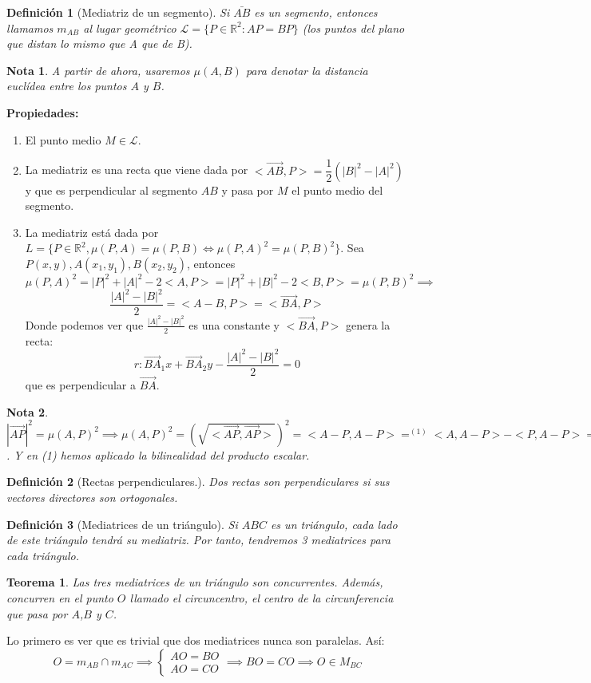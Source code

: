 \documentclass[11pt, a4paper, titlepage]{article}
\makeatletter
\renewenvironment{proof}[1][\proofname] {\vspace{-15pt}\par\pushQED{\qed}\normalfont\topsep6\p@\@plus6\p@\relax\trivlist\item[\hskip\labelsep\it#1\@addpunct{.}]\ignorespaces}{\popQED\endtrivlist\@endpefalse}
\newcommand{\R}{\mathbb{R}}
\theoremstyle{theorem-style}
\newtheorem*{nth}{Teorema}
\theoremstyle{definition-style}
\newtheorem*{ndef}{Definición}
\theoremstyle{remark-style}
\newtheorem*{nota}{Nota}
\theoremstyle{example-style}
\newenvironment{nlist}
{\begin{enumerate}
\renewcommand\labelenumi{(\emph{\roman{enumi})}}}
{\end{enumerate}}
\makeatother
\begin{document}
\begin{ndef}[Mediatriz de un segmento]
	Si $\bar{AB}$ es un segmento, entonces llamamos $m_{AB}$  al lugar geométrico $\mathcal{L}=\{P \in \R^2 : AP = BP\}$ (los puntos del plano que distan lo mismo que A que de B).
\end{ndef}
\begin{nota}
	A partir de ahora, usaremos $\mu(A,B)$ para denotar la distancia euclídea entre los puntos $A$ y $B$.
\end{nota}
\textbf{Propiedades:}
\begin{nlist}
	\item El punto medio $M \in \mathcal{L}$. 
	\item La mediatriz es una recta que viene dada por $<\vec{AB},P> = \dfrac{1}{2}(|B|^2-|A|^2)$ y que es perpendicular al segmento $AB$ y pasa por $M$ el punto medio del segmento.\\
		\begin{proof}
		La mediatriz está dada por $L = \{P\in\mathbb{R}^2, \mu(P,A) = \mu(P,B)\iff \mu(P,A)^2 = \mu(P,B)^2\}$. Sea $P(x,y),A(x_1,y_1),B(x_2,y_2)$, entonces $\mu(P,A)^2 = |P|^2+|A|^2-2<A,P> = |P|^2+|B|^2-2<B,P>= \mu(P,B)^2 \implies$ $$ \frac{|A|^2-|B|^2}{2} =<A-B,P> = <\vec{BA},P>$$
		Donde podemos ver que $\frac{|A|^2-|B|^2}{2}$ es una constante y $<\vec{BA},P>$ genera la recta:
		\[
		r: \vec{BA}_1x+ \vec{BA}_2y - \frac{|A|^2-|B|^2}{2} = 0
		\]
		que es perpendicular a $\vec{BA}$.
		\end{proof}
\end{nlist}
\begin{nota}
	$|\vec{AP}|^2 = \mu(A,P)^2\implies \mu(A,P)^2 = (\sqrt{<\vec{AP},\vec{AP}>})^2 =  < A-P, A-P>  =^{(1)} <A,A-P>-<P,A-P> = <A,A> -<A,P>+<P,P>-<P,A>  = |A|^2+|P|^2-2<P,A>$. Y en (1) hemos aplicado la bilinealidad del producto escalar.
\end{nota}

\begin{ndef}[Rectas perpendiculares.]
	Dos rectas son perpendiculares si sus vectores directores son ortogonales.
\end{ndef}

\begin{ndef}[Mediatrices de un triángulo]
	Si $ABC$ es un triángulo, cada lado de este triángulo tendrá su mediatriz. Por tanto, tendremos 3 mediatrices para cada triángulo.
\end{ndef}

\begin{nth}
	Las tres mediatrices de un triángulo son concurrentes. Además, concurren en el punto $O$ llamado el circuncentro, el centro de la circunferencia que pasa por $A$,$B$ y $C$.
\end{nth}
\begin{proof}
	Lo primero es ver que es trivial que dos mediatrices nunca son paralelas. Así:
	\[
	O = m_{AB} \cap m_{AC}\implies \begin{cases}
	AO = BO\\
	AO = CO
\end{cases} \implies BO = CO \implies O \in M_{BC}
	\]
\end{proof}
\end{document}
